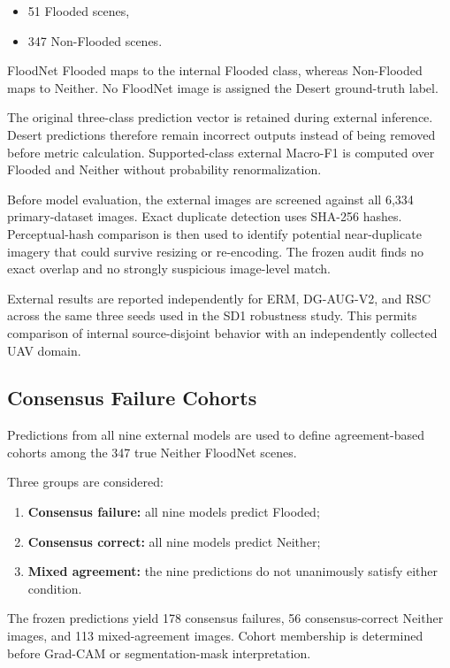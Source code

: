 \begin{itemize}
    \item 51 Flooded scenes,
    \item 347 Non-Flooded scenes.
\end{itemize}

FloodNet Flooded maps to the internal Flooded class, whereas
Non-Flooded maps to Neither. No FloodNet image is assigned the Desert
ground-truth label.

The original three-class prediction vector is retained during external
inference. Desert predictions therefore remain incorrect outputs
instead of being removed before metric calculation. Supported-class
external Macro-F1 is computed over Flooded and Neither without
probability renormalization.

Before model evaluation, the external images are screened against all
6,334 primary-dataset images. Exact duplicate detection uses SHA-256
hashes. Perceptual-hash comparison is then used to identify potential
near-duplicate imagery that could survive resizing or re-encoding.
The frozen audit finds no exact overlap and no strongly suspicious
image-level match.

External results are reported independently for ERM, DG-AUG-V2, and
RSC across the same three seeds used in the SD1 robustness study.
This permits comparison of internal source-disjoint behavior with an
independently collected UAV domain.

\subsection{Consensus Failure Cohorts}

Predictions from all nine external models are used to define
agreement-based cohorts among the 347 true Neither FloodNet scenes.

Three groups are considered:

\begin{enumerate}
    \item \textbf{Consensus failure:} all nine models predict Flooded;
    \item \textbf{Consensus correct:} all nine models predict Neither;
    \item \textbf{Mixed agreement:} the nine predictions do not
    unanimously satisfy either condition.
\end{enumerate}

The frozen predictions yield 178 consensus failures,
56 consensus-correct Neither images, and 113 mixed-agreement images.
Cohort membership is determined before Grad-CAM or segmentation-mask
interpretation.

